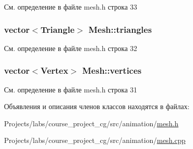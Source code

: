 См. определение в файле mesh.\+h строка 33

\subsubsection[{\texorpdfstring{triangles}{triangles}}]{\setlength{\rightskip}{0pt plus 5cm}vector$<${\bf Triangle}$>$ Mesh\+::triangles\hspace{0.3cm}{\ttfamily [private]}}\hypertarget{class_mesh_a2b30e4823d6d0d17c115018065bd1e91}{}\label{class_mesh_a2b30e4823d6d0d17c115018065bd1e91}


См. определение в файле mesh.\+h строка 32

\subsubsection[{\texorpdfstring{vertices}{vertices}}]{\setlength{\rightskip}{0pt plus 5cm}vector$<${\bf Vertex}$>$ Mesh\+::vertices\hspace{0.3cm}{\ttfamily [private]}}\hypertarget{class_mesh_abe5c05c224e47ba1e8b6393759798a9b}{}\label{class_mesh_abe5c05c224e47ba1e8b6393759798a9b}


См. определение в файле mesh.\+h строка 31



Объявления и описания членов классов находятся в файлах\+:\begin{DoxyCompactItemize}
\item 
Projects/labs/course\+\_\+project\+\_\+cg/src/animation/\hyperlink{mesh_8h}{mesh.\+h}\item 
Projects/labs/course\+\_\+project\+\_\+cg/src/animation/\hyperlink{mesh_8cpp}{mesh.\+cpp}\end{DoxyCompactItemize}
